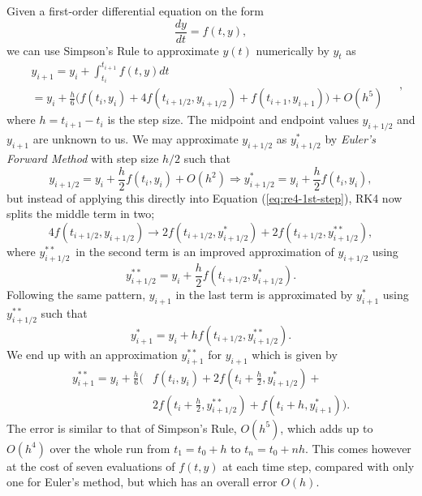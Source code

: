 \documentclass[]{article}
\begin{document}
Given a first-order differential equation on the form
\begin{equation}
	\frac{dy}{dt} = f(t, y),
\end{equation}
we can use Simpson's Rule to approximate $y(t)$ numerically by $y_t$ as
\begin{equation}
\begin{aligned} \label{eq:re4-1st-step}
		&y_{i+1} = y_i + \int_{t_i}^{t_{i+1}} f(t,y) dt \\
		&= y_i + \frac{h}{6} \big( f(t_i, y_i) + 4f(t_{i+1/2}, y_{i+1/2}) + f(t_{i+1}, y_{i+1}) \big) + O(h^5)
\end{aligned} \quad ,
\end{equation}
where $h=t_{i+1} - t_i$ is the step size. The midpoint and endpoint values $y_{i+1/2}$ and $y_{i+1}$ are unknown to us. We may approximate $y_{i+1/2}$ as $y^*_{i+1/2}$ by \textit{Euler's Forward Method} with step size $h/2$ such that
\begin{equation}
	y_{i+1/2} = y_i + \frac{h}{2} f(t_i, y_i) + O(h^2) \Rightarrow y^*_{i+1/2} = y_i + \frac{h}{2} f(t_i, y_i),
\end{equation}
but instead of applying this directly into Equation (\ref{eq:re4-1st-step}), RK4 now splits the middle term in two;
\begin{equation}
	4f(t_{i+1/2}, y_{i+1/2}) \rightarrow 2f(t_{i+1/2}, y^{*}_{i+1/2}) + 2f(t_{i+1/2}, y^{**}_{i+1/2}),
\end{equation}
where $y^{**}_{i+1/2}$ in the second term is an improved approximation of $y_{i+1/2}$ using
\begin{equation}
	y^{**}_{i+1/2} = y_i + \frac{h}{2} f(t_{i+1/2}, y^{*}_{i+1/2}).
\end{equation}
Following the same pattern, $y_{i+1}$ in the last term is approximated by $y^*_{i+1}$ using $y^{**}_{i+1/2}$ such that
\begin{equation}
	y^{*}_{i+1} = y_i + h f(t_{i+1/2}, y^{**}_{i+1/2}).
\end{equation}
We end up with an approximation $y^{**}_{i+1}$ for $y_{i+1}$ which is given by
\begin{equation}
\begin{aligned}
	y^{**}_{i+1} = y_i + \frac{h}{6} \big(& f(t_i, y_i) + 2f(t_i + \frac{h}{2}, y^*_{i+1/2}) + \\
														 &2f(t_i + \frac{h}{2}, y^{**}_{i+1/2}) + f(t_i+h, y^*_{i+1}) \big).
\end{aligned}
\end{equation}
The error is similar to that of Simpson's Rule, $O(h^5)$, which adds up to $O(h^4)$ over the whole run from $t_1=t_0+h$ to $t_n=t_0+nh$. This comes however at the cost of seven evaluations of $f(t,y)$ at each time step, compared with only one for Euler's method, but which has an overall error $O(h)$.
\end{document}
